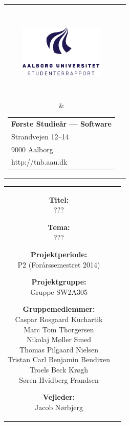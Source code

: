 \thispagestyle{empty}
\enlargethispage*{\ifcounts 4\else 2\fi\baselineskip}
{\samepage
\begin{tabular}{cc}
  \parbox{0.5\textwidth}{ %
    \hspace*{1cm} %
    \includegraphics[width=4cm,height=4cm,keepaspectratio]{images/aau_logo_da.pdf}} &
  \parbox{0.5\textwidth}{\begin{tabular}{l}
      {\small \textbf{Første Studieår --- Software}}\\
      {\small Strandvejen 12--14} \\
      {\small 9000 Aalborg} \\
      {\small http://tnb.aau.dk}
    \end{tabular}}
\end{tabular}

\begin{tabular}{cc}
  \parbox{8cm}{
  \begin{description}
    \item { \textbf{Titel:}}\\ 
      ???
    \item { \textbf{Tema:}}\\ 
      ???
  \end{description}
  
  \parbox{8cm}{
  \begin{description}
    \item { \textbf{Projektperiode:}}\\
      P2 (Forårssemestret 2014)
    \hspace{4cm}
    \item { \textbf{Projektgruppe:}}\\
        Gruppe SW2A305
    \hspace{4cm}
    \item {\textbf{Gruppemedlemmer:}}\\
      Caspar Rosgaard Kuchartik\\
      Marc Tom Thorgersen\\
      Nikolaj Møller Smed\\
      Thomas Pilgaard Nielsen\\
      Tristan Carl Benjamin Bendixen\\
      Troels Beck Krøgh\\
      Søren Hvidberg Frandsen\\
    \hspace{2cm}
    \item { \textbf{Vejleder:}}\\
      Jacob Nørbjerg\\
    \end{description}
  }

}
\end{tabular}}
